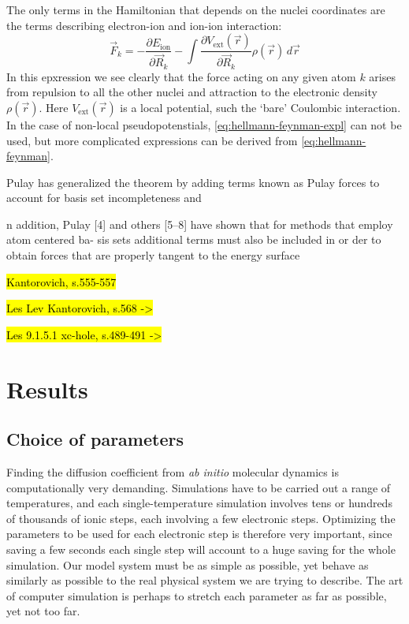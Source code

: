 \documentclass[11pt]{scrbook}   %
\newcommand{\comment}[1]{\hl{#1}}
\begin{document}
The only terms in the Hamiltonian that depends on the nuclei coordinates are the terms describing
electron-ion and ion-ion interaction:
\begin{equation}
  \vec{F}_k = - \frac{\partial E_{\text{ion}}}{\partial\vec{R}_k} - \int \frac{\partial V_{\text{ext}}(\vec{r})}{\partial\vec{R}_k} \rho(\vec{r}) \,d\vec{r}
  \label{eq:hellmann-feynman-expl}
\end{equation}
In this epxression we see clearly that the force acting on any given atom $k$ arises from repulsion to all the other nuclei and attraction to the electronic density $\rho(\vec{r})$. Here $V_{\text{ext}}(\vec{r})$ is a local potential, such the `bare' Coulombic interaction. 
In the case of non-local pseudopotenstials, \eqref{eq:hellmann-feynman-expl} can not be used, but more complicated expressions can be derived from \eqref{eq:hellmann-feynman}.



Pulay\cite{Pulay:1969} has generalized the theorem by adding terms known as Pulay forces to account
for basis set incompleteness and 

n addition, Pulay [4] and others [5–8] have shown that for methods that employ atom centered ba- sis sets additional terms must also be included in or
der to obtain forces that are properly tangent to the energy surface


\comment{Kantorovich, s.555-557}

\comment{Les Lev Kantorovich, s.568 ->}

\comment{Les 9.1.5.1 xc-hole, s.489-491 ->}




\chapter{Results}

\section{Choice of parameters}

Finding the diffusion coefficient from \textit{ab initio} molecular dynamics is computationally very demanding.
Simulations have to be carried out a range of temperatures, and each single-temperature simulation involves tens or hundreds of thousands of ionic steps, each involving a few electronic steps. 
Optimizing the parameters to be used for each electronic step is therefore very important, since saving a few seconds each single step will account to a huge saving for the whole simulation. 
Our model system must be as simple as possible, yet behave as similarly as possible to the real physical system we are trying to describe. 
The art of computer simulation is perhaps to stretch each parameter as far as possible, yet not too far. 
\end{document}
